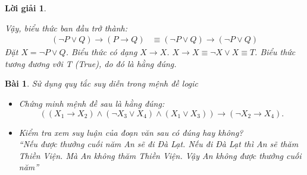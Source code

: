 \documentclass[11pt, oneside, a4paper]{article}
\newtheorem{bt}{Bài}[section]
\newtheorem{loigiai}{Lời giải}[bt]
\begin{document}
\begin{loigiai}
\begin{itemize}
\begin{itemize}
            Vậy, biểu thức ban đầu trở thành:
            \begin{align*} (\lnot P \lor Q) \rightarrow (P \rightarrow Q) &\equiv (\lnot P \lor Q) \rightarrow (\lnot P \lor Q) \end{align*}
            Đặt $X = \lnot P \lor Q$. Biểu thức có dạng $X \rightarrow X$.
            $X \rightarrow X \equiv \lnot X \lor X \equiv T$.
            Biểu thức tương đương với T (True), do đó là hằng đúng.
        \end{itemize}
    \end{itemize}
    \end{loigiai}
    
    \begin{bt}
    Sử dụng quy tắc suy diễn trong mệnh đề logic
     \begin{itemize}
      \item[a)] Chứng minh mệnh đề sau là hằng đúng: 
      $$((X_1 \rightarrow X_2) \land (\lnot X_3 \lor X_4) \land (X_1 \lor X_3)) \rightarrow (\lnot X_2 \rightarrow X_4).$$
      \item[b)] Kiểm tra xem suy luận của đoạn văn sau có đúng hay không?\\
      ``Nếu được thưởng cuối năm An sẽ đi Đà Lạt. Nếu đi Đà Lạt thì An sẽ thăm Thiền Viện. Mà An không thăm Thiền Viện. Vậy An không được thưởng cuối năm''
     \end{itemize}
    \end{bt}
    
\end{document}
